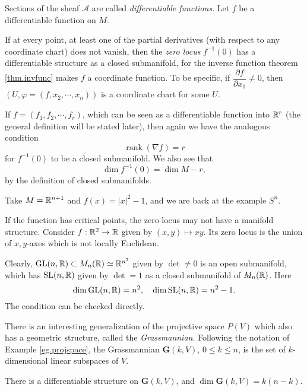 \begin{example}
    Sections of the sheaf $\mathcal{A}$ are called \emph{differentiable functions}. Let $f$ be a differentiable function on $M$. 
    
    If at every point, at least one of the partial derivatives (with respect to any coordinate chart) does not vanish, then the \emph{zero locus} $f^{-1}(0)$ has a differentiable structure as a closed submanifold, for the inverse function theorem \ref{thm.invfunc} makes $f$ a coordinate function. To be specific, if $\dfrac{\partial f}{\partial x_1}\neq 0$, then $(U,\varphi=(f,x_2,\cdots,x_n))$ is a coordinate chart for some $U$.

    If $f=(f_1,f_2,\cdots,f_r)$, which can be seen as a differentiable function into $\mathbb{R}^r$ (the general definition will be stated later), then again we have the analogous condition
    $$\operatorname{rank}(\nabla f)=r$$
    for $f^{-1}(0)$ to be a closed submanifold. We also see that 
    $$\dim f^{-1}(0)=\dim M-r,$$
    by the definition of closed submanifolds.
\end{example}

Take $M=\mathbb{R}^{n+1}$ and $f(x)=|x|^2-1$, and we are back at the example $S^n$.

If the function has critical points, the zero locus may not have a manifold structure. Consider $f:\mathbb{R}^2\to\mathbb{R}$ given by $(x,y)\mapsto xy$. Its zero locus is the union of $x,y$-axes which is not locally Euclidean.

\begin{example}
    Clearly, $\operatorname{GL}(n,\mathbb{R})\subset M_n(\mathbb{R})\simeq\mathbb{R}^{n^2}$ given by $\det\neq 0$ is an open submanifold, which has $\operatorname{SL}(n,\mathbb{R})$ given by $\det=1$ as a closed submanifold of $M_n(\mathbb{R})$. Here
    $$\dim\operatorname{GL}(n,\mathbb{R})=n^2,\quad\dim\operatorname{SL}(n,\mathbb{R})=n^2-1.$$
    The condition can be checked directly.
\end{example}

There is an interesting generalization of the projective space $P(V)$ which also has a geometric structure, called the \emph{Grassmannian}. Following the notation of Example \ref{eg.projspace}, the Grassmannian $\mathbf{G}(k,V)$, $0\leq k\leq n$, is the set of $k$-dimensional linear subspaces of $V$.

\begin{proposition}
    There is a differentiable structure on $\mathbf{G}(k,V)$, and $\dim\mathbf{G}(k,V)=k(n-k)$.
\end{proposition}

